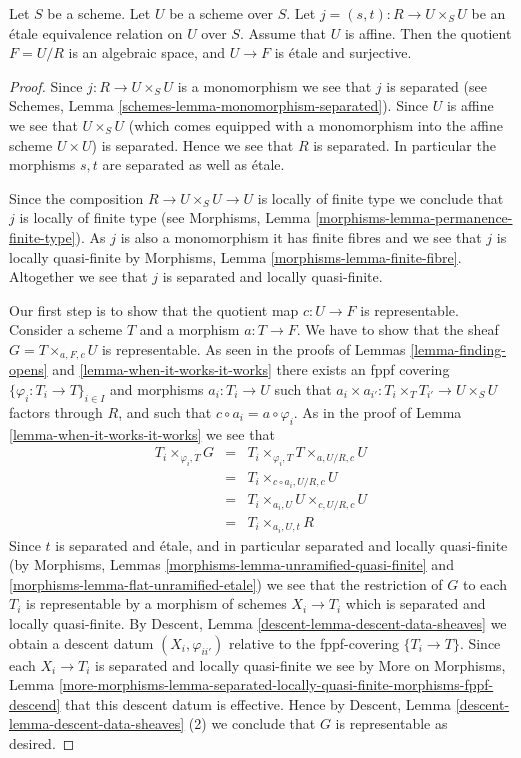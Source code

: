 \begin{lemma}
\label{lemma-presentation-quasi-compact}
Let $S$ be a scheme.
Let $U$ be a scheme over $S$.
Let $j = (s, t) : R \to U \times_S U$
be an \'etale equivalence relation on $U$ over $S$.
Assume that $U$ is affine. Then the quotient $F = U/R$
is an algebraic space, and $U \to F$ is \'etale and surjective.
\end{lemma}

\begin{proof}
Since $j : R \to U \times_S U$ is a monomorphism we see that $j$ is separated
(see Schemes, Lemma \ref{schemes-lemma-monomorphism-separated}).
Since $U$ is affine we see that $U \times_S U$
(which comes equipped with a monomorphism into the affine scheme
$U \times U$) is separated. Hence we see that $R$ is separated.
In particular the morphisms $s, t$ are separated as well as \'etale.

\medskip\noindent
Since the composition $R \to U \times_S U \to U$ is
locally of finite type we conclude that
$j$ is locally of finite type (see
Morphisms, Lemma \ref{morphisms-lemma-permanence-finite-type}).
As $j$ is also a monomorphism it has finite fibres and
we see that $j$ is locally quasi-finite by
Morphisms, Lemma \ref{morphisms-lemma-finite-fibre}.
Altogether we see that $j$ is separated and locally quasi-finite.

\medskip\noindent
Our first step is to show that the quotient map
$c : U \to F$ is representable.
Consider a scheme $T$ and a morphism $a : T \to F$.
We have to show that the sheaf $G = T \times_{a, F, c} U$
is representable.
As seen in the proofs of Lemmas \ref{lemma-finding-opens} and
\ref{lemma-when-it-works-it-works} there exists an fppf covering
$\{\varphi_i : T_i \to T\}_{i \in I}$ and morphisms $a_i : T_i \to U$
such that $a_i \times a_{i'} : T_i \times_T T_{i'} \to U \times_S U$
factors through $R$, and such that $c \circ a_i = a \circ \varphi_i$.
As in the proof of Lemma \ref{lemma-when-it-works-it-works} we see that
\begin{eqnarray*}
T_i \times_{\varphi_i, T} G & = &
T_i \times_{\varphi_i, T} T \times_{a, U/R, c} U \\
& = & T_i \times_{c \circ a_i, U/R, c} U \\
& = & T_i \times_{a_i, U} U \times_{c, U/R, c} U \\
& = & T_i \times_{a_i, U, t} R
\end{eqnarray*}
Since $t$ is separated and \'etale, and in particular
separated and locally quasi-finite (by Morphisms, Lemmas
\ref{morphisms-lemma-unramified-quasi-finite} and
\ref{morphisms-lemma-flat-unramified-etale})
we see that the restriction
of $G$ to each $T_i$ is representable by a morphism of schemes
$X_i \to T_i$ which is separated and locally quasi-finite. By
Descent, Lemma \ref{descent-lemma-descent-data-sheaves}
we obtain a descent datum $(X_i, \varphi_{ii'})$ relative
to the fppf-covering $\{T_i \to T\}$. Since each
$X_i \to T_i$ is separated and locally quasi-finite we see by
More on Morphisms, Lemma
\ref{more-morphisms-lemma-separated-locally-quasi-finite-morphisms-fppf-descend}
that this descent datum is effective.
Hence by
Descent, Lemma \ref{descent-lemma-descent-data-sheaves} (2)
we conclude that $G$ is representable as desired.


\end{proof}
